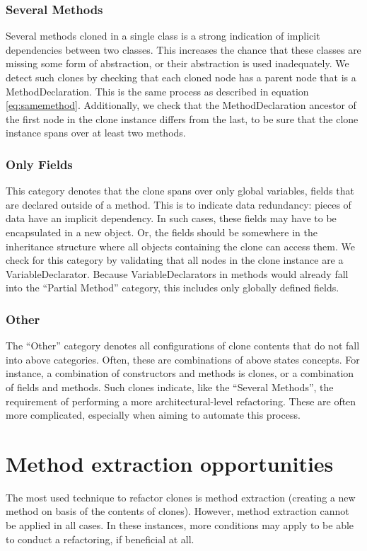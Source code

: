 \subsubsection{Several Methods}
Several methods cloned in a single class is a strong indication of implicit dependencies between two classes. This increases the chance that these classes are missing some form of abstraction, or their abstraction is used inadequately. We detect such clones by checking that each cloned node has a parent node that is a MethodDeclaration. This is the same process as described in equation \ref{eq:samemethod}. Additionally, we check that the MethodDeclaration ancestor of the first node in the clone instance differs from the last, to be sure that the clone instance spans over at least two methods.

\subsubsection{Only Fields}
This category denotes that the clone spans over only global variables, fields that are declared outside of a method. This is to indicate data redundancy: pieces of data have an implicit dependency. In such cases, these fields may have to be encapsulated in a new object. Or, the fields should be somewhere in the inheritance structure where all objects containing the clone can access them. We check for this category by validating that all nodes in the clone instance are a VariableDeclarator. Because VariableDeclarators in methods would already fall into the ``Partial Method'' category, this includes only globally defined fields.

\subsubsection{Other}
The ``Other'' category denotes all configurations of clone contents that do not fall into above categories. Often, these are combinations of above states concepts. For instance, a combination of constructors and methods is clones, or a combination of fields and methods. Such clones indicate, like the ``Several Methods'', the requirement of performing a more architectural-level refactoring. These are often more complicated, especially when aiming to automate this process.

\section{Method extraction opportunities}\label{sec:refactorabilitysetup}
The most used technique to refactor clones is method extraction (creating a new method on basis of the contents of clones). However, method extraction cannot be applied in all cases. In these instances, more conditions may apply to be able to conduct a refactoring, if beneficial at all.

